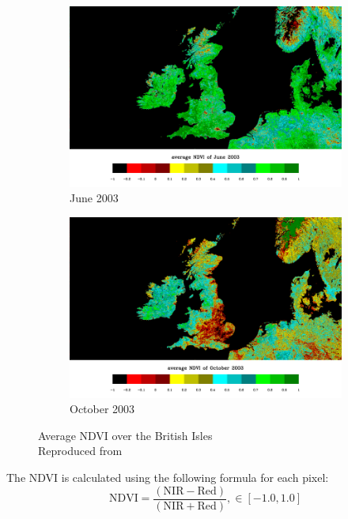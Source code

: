\begin{figure}[H]
\begin{subfigure}{0.5\textwidth}
\centering
\includegraphics[scale=0.25]{images/NDVI_062003.png}
\caption{June 2003}
\end{subfigure}
\begin{subfigure}{0.5\textwidth}
\centering
\includegraphics[scale=0.25]{images/NDVI_102003.png}
\caption{October 2003}
\end{subfigure}
\caption{Average NDVI over the British Isles\\
Reproduced from \cite{ndvi_wiki}}
\label{fig:ndvi_british}
\end{figure}

\noindent
The NDVI is calculated using the following formula for each pixel:\\

\begin{equation}\label{eq:ndvi}
{\displaystyle{\mbox{NDVI}}={\frac {({\mbox{NIR}}-{\mbox{Red}})}{({\mbox{NIR}}+{\mbox{Red}})}}}, \in [-1.0, 1.0]
\end{equation}

